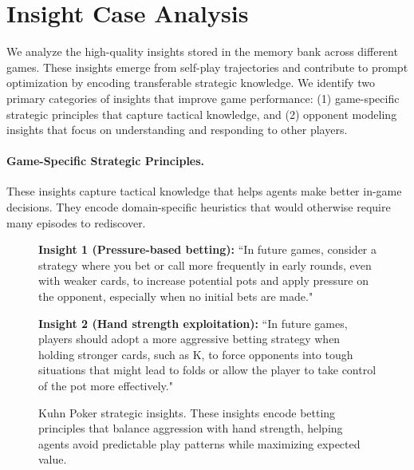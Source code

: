 \section{Insight Case Analysis}
\label{appendix:insightcaseanalysis}

We analyze the high-quality insights stored in the memory bank across different games. These insights emerge from self-play trajectories and contribute to prompt optimization by encoding transferable strategic knowledge. We identify two primary categories of insights that improve game performance: (1) game-specific strategic principles that capture tactical knowledge, and (2) opponent modeling insights that focus on understanding and responding to other players.

\paragraph{Game-Specific Strategic Principles.}
These insights capture tactical knowledge that helps agents make better in-game decisions. They encode domain-specific heuristics that would otherwise require many episodes to rediscover.

\begin{figure}[H]
\centering
\begin{tcolorbox}[
    colback=blue!5!white,
    colframe=blue!40!white,
    left=1mm, right=1mm, top=1mm, bottom=1mm,
    width=\textwidth,
    enhanced,
    attach boxed title to top center={yshift=-2mm},
    boxed title style={colback=blue!40!white},
    title={Kuhn Poker Strategic Insights},
    label=box:kuhn_poker_strategic
]

\textbf{Insight 1 (Pressure-based betting):}
``In future games, consider a strategy where you bet or call more frequently in early rounds, even with weaker cards, to increase potential pots and apply pressure on the opponent, especially when no initial bets are made."

\textbf{Insight 2 (Hand strength exploitation):}
``In future games, players should adopt a more aggressive betting strategy when holding stronger cards, such as K, to force opponents into tough situations that might lead to folds or allow the player to take control of the pot more effectively."

\end{tcolorbox}
\caption{Kuhn Poker strategic insights. These insights encode betting principles that balance aggression with hand strength, helping agents avoid predictable play patterns while maximizing expected value.}
\label{box:kuhn_poker_strategic}
\end{figure}

